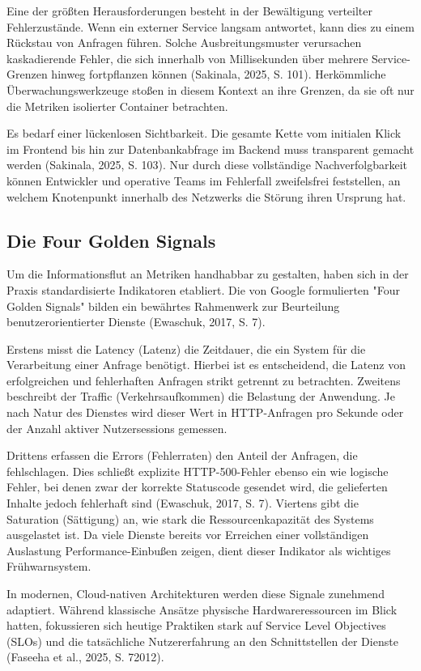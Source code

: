 Eine der größten Herausforderungen besteht in der Bewältigung verteilter Fehlerzustände. Wenn ein externer Service langsam antwortet, kann dies zu einem Rückstau von Anfragen führen. Solche Ausbreitungsmuster verursachen kaskadierende Fehler, die sich innerhalb von Millisekunden über mehrere Service-Grenzen hinweg fortpflanzen können (Sakinala, 2025, S. 101). Herkömmliche Überwachungswerkzeuge stoßen in diesem Kontext an ihre Grenzen, da sie oft nur die Metriken isolierter Container betrachten.

Es bedarf einer lückenlosen Sichtbarkeit. Die gesamte Kette vom initialen Klick im Frontend bis hin zur Datenbankabfrage im Backend muss transparent gemacht werden (Sakinala, 2025, S. 103). Nur durch diese vollständige Nachverfolgbarkeit können Entwickler und operative Teams im Fehlerfall zweifelsfrei feststellen, an welchem Knotenpunkt innerhalb des Netzwerks die Störung ihren Ursprung hat.

\subsection{Die Four Golden Signals}

Um die Informationsflut an Metriken handhabbar zu gestalten, haben sich in der Praxis standardisierte Indikatoren etabliert. Die von Google formulierten "Four Golden Signals" bilden ein bewährtes Rahmenwerk zur Beurteilung benutzerorientierter Dienste (Ewaschuk, 2017, S. 7).

Erstens misst die Latency (Latenz) die Zeitdauer, die ein System für die Verarbeitung einer Anfrage benötigt. Hierbei ist es entscheidend, die Latenz von erfolgreichen und fehlerhaften Anfragen strikt getrennt zu betrachten. Zweitens beschreibt der Traffic (Verkehrsaufkommen) die Belastung der Anwendung. Je nach Natur des Dienstes wird dieser Wert in HTTP-Anfragen pro Sekunde oder der Anzahl aktiver Nutzersessions gemessen.

Drittens erfassen die Errors (Fehlerraten) den Anteil der Anfragen, die fehlschlagen. Dies schließt explizite HTTP-500-Fehler ebenso ein wie logische Fehler, bei denen zwar der korrekte Statuscode gesendet wird, die gelieferten Inhalte jedoch fehlerhaft sind (Ewaschuk, 2017, S. 7). Viertens gibt die Saturation (Sättigung) an, wie stark die Ressourcenkapazität des Systems ausgelastet ist. Da viele Dienste bereits vor Erreichen einer vollständigen Auslastung Performance-Einbußen zeigen, dient dieser Indikator als wichtiges Frühwarnsystem.

In modernen, Cloud-nativen Architekturen werden diese Signale zunehmend adaptiert. Während klassische Ansätze physische Hardwareressourcen im Blick hatten, fokussieren sich heutige Praktiken stark auf Service Level Objectives (SLOs) und die tatsächliche Nutzererfahrung an den Schnittstellen der Dienste (Faseeha et al., 2025, S. 72012).

